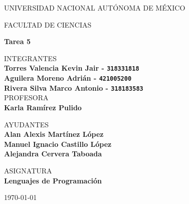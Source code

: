 \documentclass{article}
\begin{document}
	\begin{center}
	\vspace{0.8cm}
	\LARGE
	UNIVERSIDAD NACIONAL AUTÓNOMA DE MÉXICO

	\vspace{0.7cm}
	\LARGE
	FACULTAD DE CIENCIAS

	\vspace{0.8 cm}
	\Large
	\textbf{Tarea 5}

	\vspace{0.8 cm}
	\normalsize
	INTEGRANTES \\
	\vspace{.2cm}
	\large
	\textbf{Torres Valencia Kevin Jair - \texttt{318331818}}\\
	\textbf{Aguilera Moreno Adrián - \texttt{421005200}}\\
	\textbf{Rivera Silva Marco Antonio - \texttt{318183583}}\\

	\vspace{1 cm}
	\normalsize
	PROFESORA \\
	\vspace{.2cm}
	\large
	\textbf{Karla Ramírez Pulido}

	\vspace{1 cm}
	AYUDANTES \\
	\vspace{.2cm}
	\large
	\textbf{Alan Alexis Martínez López}\\
	\textbf{Manuel Ignacio Castillo López}\\
	\textbf{Alejandra Cervera Taboada}
	\vspace{1.3cm}

	\normalsize
	ASIGNATURA \\
	\vspace{.2cm}
	\large
	\textbf{Lenguajes de Programación}

	\vspace{1 cm}
	\today
	\end{center}

	\newpage
	
	
	
	
	
\end{document}
